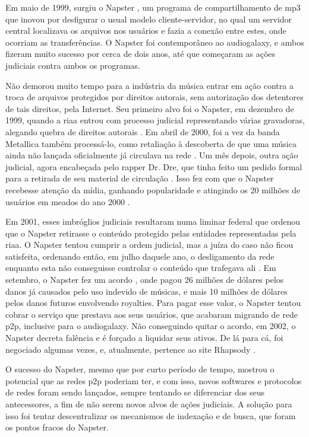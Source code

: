 Em maio de 1999, surgiu o Napster \cite{wiki:napster}, um programa de compartilhamento
de \gls*{mp3} que inovou por desfigurar o usual modelo cliente-servidor, no qual um
servidor central localizava os arquivos nos usuários e fazia a conexão entre estes,
onde ocorriam as transferências. O Napster foi contemporâneo ao \gls*{audiogalaxy}, e
ambos fizeram muito sucesso por cerca de dois anos, até que começaram as ações judiciais
contra ambos os programas.

Não demorou muito tempo para a indústria da música entrar em ação contra a troca de
arquivos protegidos por direitos autorais, sem autorização dos detentores de tais
direitos, pela Internet. Seu primeiro alvo foi o Napster, em dezembro de 1999, quando a
\gls{riaa} entrou com processo judicial representando várias gravadoras, alegando
quebra de direitos autorais \cite{site:napster-riaa}. Em abril de 2000, foi a vez da
banda Metallica também processá-lo, como retaliação à descoberta de que uma música
ainda não lançada oficialmente já circulava na rede
\cite{site:napster-metallica,site:napster-metallica-orig}. Um mês depois, outra ação
judicial, agora encabeçada pelo rapper Dr. Dre, que tinha feito um pedido formal para a
retirada de seu material de circulação \cite{site:napster-drdre-orig}. Isso fez com que
o Napster recebesse atenção da mídia, ganhando popularidade e atingindo os 20 milhões
de usuários em meados do ano 2000 \cite{site:napster-use-2000}.

Em 2001, esses imbróglios judiciais resultaram numa liminar federal que ordenou que o
Napster retirasse o conteúdo protegido pelas entidades representadas pela \gls*{riaa}. O
Napster tentou cumprir a ordem judicial, mas a juíza do caso não ficou satisfeita,
ordenando então, em julho daquele ano, o desligamento da rede enquanto esta não
conseguisse controlar o conteúdo que trafegava ali \cite{wiki:napster}. Em setembro, o
Napster fez um acordo \cite{wiki:napstervsriaa}, onde pagou 26 milhões de dólares pelos
danos já causados pelo uso indevido de músicas, e mais 10 milhões de dólares pelos
danos futuros envolvendo royalties. Para pagar esse valor, o Napster tentou cobrar o
serviço que prestava aos seus usuários, que acabaram migrando de rede \gls*{p2p},
inclusive para o \gls*{audiogalaxy}. Não conseguindo quitar o acordo, em 2002, o
Napster decreta falência e é forçado a liquidar seus ativos. De lá para cá, foi
negociado algumas vezes, e, atualmente, pertence ao site Rhapsody
\cite{site:napster-rhapsody}.

O sucesso do Napster, mesmo que por curto período de tempo, mostrou o potencial que as
redes \gls*{p2p} poderiam ter, e com isso, novos softwares e protocolos de redes foram
sendo lançados, sempre tentando se diferenciar dos seus antecessores, a fim de não serem
novos alvos de ações judiciais. A solução para isso foi tentar descentralizar os
mecanismos de indexação e de busca, que foram os pontos fracos do Napster.

